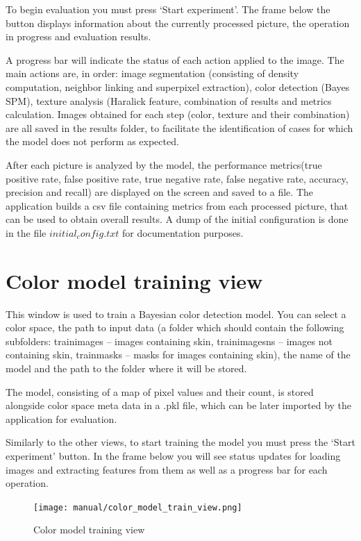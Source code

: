 \documentclass[12pt]{report}
\begin{document}
	To begin evaluation you must press ‘Start experiment’. The frame below the button displays information about the currently processed picture, the operation in progress and evaluation results. 
	
	A progress bar will indicate the status of each action applied to the image. The main actions are, in order: image segmentation (consisting of density computation, neighbor linking and superpixel extraction), color detection (Bayes SPM), texture analysis (Haralick feature, combination of results and metrics calculation. Images obtained for each step (color, texture and their combination) are all saved in the results folder, to facilitate the identification of cases for which the model does not perform as expected.
	
	After each picture is analyzed by the model, the performance metrics(true positive rate, false positive rate, true negative rate, false negative rate, accuracy, precision and recall) are displayed on the screen and saved to a file.
	The application builds a csv file containing metrics from each processed picture, that can be used to obtain overall results. A dump of the initial configuration is done in the file $initial_config.txt$ for documentation purposes.
	
	\section{Color model training view}
	This window is used to train a Bayesian color detection model. You can select a color space, the path to input data (a folder which should contain the following subfolders: train\textunderscore images – images containing skin, train\textunderscore images\textunderscore ns – images not containing skin, train\textunderscore masks – masks for images containing skin), the name of the model and the path to the folder where it will be stored. 
	
	The model, consisting of a map of pixel values and their count, is stored alongside color space meta data in a .pkl file, which can be later imported by the application for evaluation.
	
	Similarly to the other views, to start training the model you must press the ‘Start experiment’ button. In the frame below you will see status updates for loading images and extracting features from them as well as a progress bar for each operation.
	
	\begin{figure}[h!]
		\centering
		\texttt{[image: manual/color\_model\_train\_view.png]}
		\caption{Color model training view}
	\end{figure}
\end{document}

